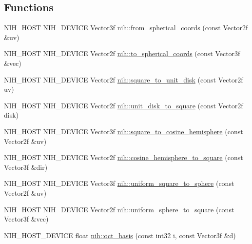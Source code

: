 \subsection*{\-Functions}
\begin{DoxyCompactItemize}
\item 
\-N\-I\-H\-\_\-\-H\-O\-S\-T \-N\-I\-H\-\_\-\-D\-E\-V\-I\-C\-E \-Vector3f \hyperlink{group__spherical__functions_gabb50d34723dc8f63f83481dda7e4538a}{nih\-::from\-\_\-spherical\-\_\-coords} (const \-Vector2f \&uv)
\item 
\-N\-I\-H\-\_\-\-H\-O\-S\-T \-N\-I\-H\-\_\-\-D\-E\-V\-I\-C\-E \-Vector2f \hyperlink{group__spherical__functions_gae14d642cb444062ebf966fc27f379972}{nih\-::to\-\_\-spherical\-\_\-coords} (const \-Vector3f \&vec)
\item 
\-N\-I\-H\-\_\-\-H\-O\-S\-T \-N\-I\-H\-\_\-\-D\-E\-V\-I\-C\-E \-Vector2f \hyperlink{group__spherical__functions_ga5852f54031a04a3c2622ac9c1c3ee181}{nih\-::square\-\_\-to\-\_\-unit\-\_\-disk} (const \-Vector2f uv)
\item 
\-N\-I\-H\-\_\-\-H\-O\-S\-T \-N\-I\-H\-\_\-\-D\-E\-V\-I\-C\-E \-Vector2f \hyperlink{group__spherical__functions_ga4c1322b35d3548385cfbcde647eaa9b6}{nih\-::unit\-\_\-disk\-\_\-to\-\_\-square} (const \-Vector2f disk)
\item 
\-N\-I\-H\-\_\-\-H\-O\-S\-T \-N\-I\-H\-\_\-\-D\-E\-V\-I\-C\-E \-Vector3f \hyperlink{group__spherical__functions_ga8b4bb2387e2dcc609267e00777c753d1}{nih\-::square\-\_\-to\-\_\-cosine\-\_\-hemisphere} (const \-Vector2f \&uv)
\item 
\-N\-I\-H\-\_\-\-H\-O\-S\-T \-N\-I\-H\-\_\-\-D\-E\-V\-I\-C\-E \-Vector2f \hyperlink{group__spherical__functions_ga1e65205c0882ccfa8b8cea7ab18525ce}{nih\-::cosine\-\_\-hemisphere\-\_\-to\-\_\-square} (const \-Vector3f \&dir)
\item 
\-N\-I\-H\-\_\-\-H\-O\-S\-T \-N\-I\-H\-\_\-\-D\-E\-V\-I\-C\-E \-Vector3f \hyperlink{group__spherical__functions_ga711e9a117559053c96478f404aa2a278}{nih\-::uniform\-\_\-square\-\_\-to\-\_\-sphere} (const \-Vector2f \&uv)
\item 
\-N\-I\-H\-\_\-\-H\-O\-S\-T \-N\-I\-H\-\_\-\-D\-E\-V\-I\-C\-E \-Vector2f \hyperlink{group__spherical__functions_ga74d80bd5bc66492ae691520586329be5}{nih\-::uniform\-\_\-sphere\-\_\-to\-\_\-square} (const \-Vector3f \&vec)
\item 
\-N\-I\-H\-\_\-\-H\-O\-S\-T\-\_\-\-D\-E\-V\-I\-C\-E float \hyperlink{group__spherical__functions_gae4f57aa8c225e3b15676f3c5cc049d20}{nih\-::oct\-\_\-basis} (const int32 i, const \-Vector3f \&d)

\end{DoxyCompactItemize}
